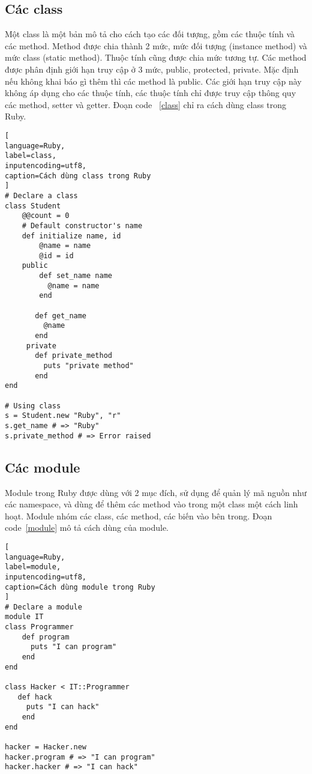 \subsection{Các class}
Một class là một bản mô tả cho cách tạo các đối tượng, gồm các thuộc tính và các method.
Method được chia thành 2 mức, mức đối tượng (instance method) và mức class (static method).
Thuộc tính cũng được chia mức tương tự. Các method được phân định giới hạn truy cập ở 3 mức, public, protected, private. Mặc định nếu không khai báo gì thêm thì các method là public. Các giới hạn truy cập này không áp dụng cho các thuộc tính, các thuộc tính chỉ được truy cập thông quy các method, setter và getter. Đoạn code ~\ref{class} chỉ ra cách dùng class trong Ruby.
\begin{lstlisting}[
language=Ruby,
label=class,
inputencoding=utf8,
caption=Cách dùng class trong Ruby
]
# Declare a class
class Student
    @@count = 0
    # Default constructor's name
    def initialize name, id
        @name = name
        @id = id
    public
        def set_name name
          @name = name
        end

       def get_name
         @name
       end
     private
       def private_method
         puts "private method"
       end
end

# Using class
s = Student.new "Ruby", "r"
s.get_name # => "Ruby"
s.private_method # => Error raised

\end{lstlisting}
\subsection{Các module}
Module trong Ruby được dùng với 2 mục đích, sử dụng để quản lý mã nguồn như các namespace, và dùng để thêm các method vào trong một class một cách linh hoạt. Module nhóm các class, các method, các biến vào bên trong. Đoạn code~\ref{module} mô tả cách dùng của module.
\begin{lstlisting}[
language=Ruby,
label=module,
inputencoding=utf8,
caption=Cách dùng module trong Ruby
]
# Declare a module
module IT
class Programmer
    def program
      puts "I can program"
    end
end

class Hacker < IT::Programmer
   def hack
     puts "I can hack"  
	end
end

hacker = Hacker.new
hacker.program # => "I can program"
hacker.hacker # => "I can hack"
\end{lstlisting}
